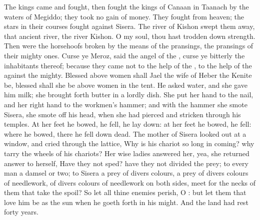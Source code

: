 \begin{biblechapter}
\verse The kings came and fought, then fought the kings of Canaan in Taanach by the waters of Megiddo; they took no gain of money.
\verse They fought from heaven; the stars in their courses fought against Sisera.
\verse The river of Kishon swept them away, that ancient river, the river Kishon. O my soul, thou hast trodden down strength.
\verse Then were the horsehoofs broken by the means of the pransings, the pransings of their mighty ones.
\verse Curse ye Meroz, said the angel of the \LORD, curse ye bitterly the inhabitants thereof; because they came not to the help of the \LORD, to the help of the \LORD against the mighty.
\verse Blessed above women shall Jael the wife of Heber the Kenite be, blessed shall she be above women in the tent.
\verse He asked water, and she gave him milk; she brought forth butter in a lordly dish.
\verse She put her hand to the nail, and her right hand to the workmen's hammer; and with the hammer she smote Sisera, she smote off his head, when she had pierced and stricken through his temples.
\verse At her feet he bowed, he fell, he lay down: at her feet he bowed, he fell: where he bowed, there he fell down dead.
\verse The mother of Sisera looked out at a window, and cried through the lattice, Why is his chariot so long in coming? why tarry the wheels of his chariots?
\verse Her wise ladies answered her, yea, she returned answer to herself,
\verse Have they not sped? have they not divided the prey; to every man a damsel or two; to Sisera a prey of divers colours, a prey of divers colours of needlework, of divers colours of needlework on both sides, meet for the necks of them that take the spoil?
\verse So let all thine enemies perish, O \LORD: but let them that love him be as the sun when he goeth forth in his might. And the land had rest forty years.
\end{biblechapter}

